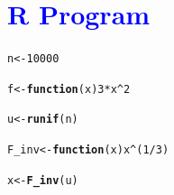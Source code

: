 \documentclass[11pt, a4paper]{article}\usepackage[]{graphicx}\usepackage[]{xcolor}
\makeatletter
\newcommand{\hlnum}[1]{\textcolor[rgb]{0.686,0.059,0.569}{#1}}%
\newcommand{\hlopt}[1]{\textcolor[rgb]{0,0,0}{#1}}%
\newcommand{\hldef}[1]{\textcolor[rgb]{0.345,0.345,0.345}{#1}}%
\newcommand{\hlkwa}[1]{\textcolor[rgb]{0.161,0.373,0.58}{\textbf{#1}}}%
\newcommand{\hlkwb}[1]{\textcolor[rgb]{0.69,0.353,0.396}{#1}}%
\newcommand{\hlkwc}[1]{\textcolor[rgb]{0.333,0.667,0.333}{#1}}%
\newcommand{\hlkwd}[1]{\textcolor[rgb]{0.737,0.353,0.396}{\textbf{#1}}}%
\newenvironment{kframe}{%
 \def\at@end@of@kframe{}%
 \ifinner\ifhmode%
  \def\at@end@of@kframe{\end{minipage}}%
  \begin{minipage}{\columnwidth}%
 \fi\fi%
 \def\FrameCommand##1{\hskip\@totalleftmargin \hskip-\fboxsep
 \colorbox{shadecolor}{##1}\hskip-\fboxsep
     \hskip-\linewidth \hskip-\@totalleftmargin \hskip\columnwidth}%
 \MakeFramed {\advance\hsize-\width
   \@totalleftmargin\z@ \linewidth\hsize
   \@setminipage}}%
 {\par\unskip\endMakeFramed%
 \at@end@of@kframe}
\newenvironment{knitrout}{}{} %
\makeatother
\begin{document}
\section*{\faArrowAltCircleRight[regular] \textcolor{blue}{R Program}}



\begin{knitrout}
\color{fgcolor}\begin{kframe}
\begin{alltt}
\hldef{n} \hlkwb{<-} \hlnum{10000}
\end{alltt}
\end{kframe}
\end{knitrout}

\begin{knitrout}
\color{fgcolor}\begin{kframe}
\begin{alltt}
\hldef{f} \hlkwb{<-} \hlkwa{function}\hldef{(}\hlkwc{x}\hldef{)} \hlnum{3} \hlopt{*} \hldef{x}\hlopt{^}\hlnum{2}
\end{alltt}
\end{kframe}
\end{knitrout}

\begin{knitrout}
\color{fgcolor}\begin{kframe}
\begin{alltt}
\hldef{u} \hlkwb{<-} \hlkwd{runif}\hldef{(n)}
\end{alltt}
\end{kframe}
\end{knitrout}

\begin{knitrout}
\color{fgcolor}\begin{kframe}
\begin{alltt}
\hldef{F_inv} \hlkwb{<-} \hlkwa{function}\hldef{(}\hlkwc{x}\hldef{) x}\hlopt{^}\hldef{(}\hlnum{1}\hlopt{/}\hlnum{3}\hldef{)}
\end{alltt}
\end{kframe}
\end{knitrout}

\begin{knitrout}
\color{fgcolor}\begin{kframe}
\begin{alltt}
\hldef{x} \hlkwb{<-} \hlkwd{F_inv}\hldef{(u)}
\end{alltt}
\end{kframe}
\end{knitrout}
\end{document}
